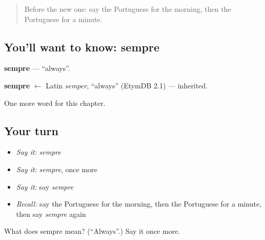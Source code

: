 \begin{quote}
Before the new one: say the Portuguese for the morning, then the Portuguese for a minute.
\end{quote}

\subsection*{You'll want to know: sempre}
\textbf{sempre} — \textquotedblleft{}always\textquotedblright{}.

\begin{cousinweb}
\textbf{sempre} $\leftarrow$ Latin \emph{semper}, \textquotedblleft{}always\textquotedblright{} (EtymDB 2.1) — inherited.
\end{cousinweb}

\begin{grammarlens}[title={What you've built}]
One more word for this chapter.
\end{grammarlens}

\subsection*{Your turn}
\begin{itemize}
\raggedright
  \item \emph{Say it:} \emph{sempre}
  \item \emph{Say it:} \emph{sempre}, once more
  \item \emph{Say it:} say \emph{sempre}
  \item \emph{Recall:} say the Portuguese for the morning, then the Portuguese for a minute, then say \emph{sempre} again
\end{itemize}

\begin{tcolorbox}[breakable,colback=teal!4,colframe=teal!35!black,title={Before you move on}]
What does sempre mean? (\textquotedblleft{}Always\textquotedblright{}.) Say it once more.
\end{tcolorbox}
